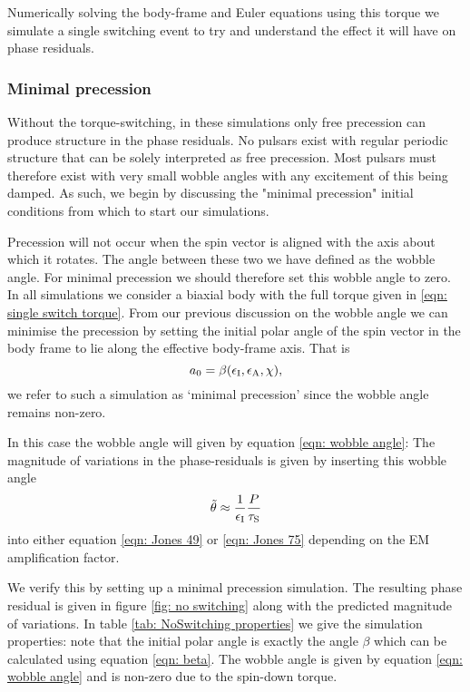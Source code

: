 \documentclass[../full_thesis/full_thesis.tex]{subfiles}
\begin{document}
Numerically solving the body-frame and Euler equations using this torque we 
simulate a single switching event to try and understand the effect it will have
on phase residuals. 

\subsubsection{Minimal precession}
Without the torque-switching, in these simulations only free precession can 
produce structure in the phase residuals. No pulsars exist with regular periodic
structure that can be solely interpreted as free precession. Most pulsars must 
therefore exist with very small wobble angles with any excitement of this being
damped. As such, we begin by discussing the "minimal precession" initial 
conditions from which to start our simulations. 


Precession will not occur when the spin vector is aligned with the axis about
which it rotates. The angle between these two we have defined as the wobble
angle.  For minimal precession we should therefore set this wobble angle to
zero. In all simulations we consider a biaxial body with the full torque given
in \eqref{eqn: single switch torque}. From our previous discussion on the 
wobble angle we can minimise the precession by setting the initial polar angle
of the spin vector in the body frame to lie along the effective body-frame 
axis. That is
\begin{equation}
a_{0} = \beta(\epsilon_{\mathrm{I}}, \epsilon_{\mathrm{A}}, \chi),
\end{equation}
we refer to such a simulation as `minimal precession' since the wobble angle 
remains non-zero.

In this case the wobble angle will given by equation \eqref{eqn: wobble angle}:
The magnitude of variations in the phase-residuals is given by inserting this
wobble angle
\begin{equation}
\tilde{\theta} \approx \frac{1}{\epsilon_{\mathrm{I}}}{\frac{P}{\tau_{\mathrm{S}}}}
\end{equation} 
into either equation \eqref{eqn: Jones 49} or \eqref{eqn: Jones 75} depending 
on the EM amplification factor.

We verify this by setting up a minimal precession simulation. The resulting
phase residual is given in figure \ref{fig: no switching} along with the
predicted magnitude of variations. In table \ref{tab: NoSwitching properties}
we give the simulation properties: note that the initial polar angle is exactly
the angle $\beta$ which can be calculated using equation \eqref{eqn: beta}. 
The wobble angle is given by equation \eqref{eqn: wobble angle} and is non-zero
due to the spin-down torque. 
\end{document}
